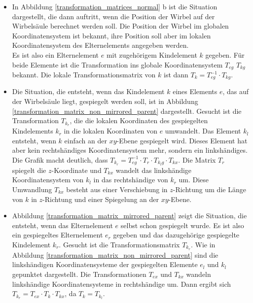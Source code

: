 \begin{itemize}
 \item In Abbildung \ref{transformation_matrices_normal} b ist die Situation dargestellt, die \ua dann auftritt, wenn die Position der Wirbel auf der Wirbelsäule berechnet werden soll. Die Position der Wirbel im globalen Koordinatensystem ist bekannt, ihre Position soll aber im lokalen Koordinatensystem des Elternelements angegeben werden.\\
 Es ist also ein Elternelement $e$ mit zugehörigem Kindelement $k$ gegeben. Für beide Elemente ist die Transformation ins globale Koordinatensystem $T_{eg}$ \bzw $T_{kg}$ bekannt. Die lokale Transformationsmatrix von $k$ ist dann $T_k = T^{-1}_{eg} \cdot T_{kg}$.
 
 \item Die Situation, die entsteht, wenn das Kindelement $k$ eines Elements $e$, das auf der Wirbelsäule liegt, gespiegelt werden soll, ist in Abbildung \ref{transformation_matrix_non_mirrored_parent} dargestellt. Gesucht ist die Transformation $T_{k_r}$, die die lokalen Koordinaten des gespiegelten Kindelements $k_r$ in die lokalen Koordinaten von $e$ umwandelt. Das Element $k_l$ entsteht, wenn $k$ einfach an der $xy$-Ebene gespiegelt wird. Dieses Element hat aber kein rechtshändiges Koordinatensystem mehr, sondern ein linkshändiges. Die Grafik macht deutlich, dass $T_{k_r} = T_{eg}^{-1} \cdot T_r \cdot T_{k_lg} \cdot T_{kx}$. Die Matrix $T_r$ spiegelt die $z$-Koordinate und $T_{kx}$ wandelt das linkshändige Koordinatensystem von $k_l$ in das rechtshändige von $k_r$ um. Diese Umwandlung $T_{kx}$ besteht aus einer Verschiebung in $z$-Richtung um die Länge von $k$ in $z$-Richtung und einer Spiegelung an der $xy$-Ebene.
 
 \item Abbildung \ref{transformation_matrix_mirrored_parent} zeigt die Situation, die entsteht, wenn das Elternelement $e$ selbst schon gespiegelt wurde. 
 Es ist also ein gespiegeltes Elternelement $e_r$ gegeben und das dazugehörige gespiegelte Kindelement $k_r$. Gesucht ist die Transformationsmatrix $T_{k_r}$. Wie in Abbildung \ref{transformation_matrix_non_mirrored_parent} sind die linkshändigen Koordinatensysteme der gespiegelten Elemente $e_l$ und $k_l$ gepunktet dargestellt. Die Transformationen $T_{ex}$ und $T_{kx}$ wandeln linkshändige Koordinatensysteme in rechtshändige um. Dann ergibt sich \mbox{$T_{k_r} = T_{ex} \cdot T_k \cdot T_{kx}$}, da $T_k = T_{k_l}$.
\end{itemize}

